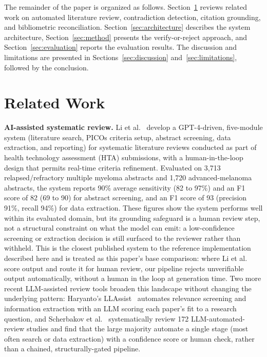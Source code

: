 \documentclass[11pt]{article}
\begin{document}
The remainder of the paper is organized as follows. Section~\ref{sec:related} reviews related work on automated literature review, contradiction detection, citation grounding, and bibliometric reconciliation. Section~\ref{sec:architecture} describes the system architecture, Section~\ref{sec:method} presents the verify-or-reject approach, and Section~\ref{sec:evaluation} reports the evaluation results. The discussion and limitations are presented in Sections~\ref{sec:discussion} and~\ref{sec:limitations}, followed by the conclusion.

\section{Related Work}
\label{sec:related}

\textbf{AI-assisted systematic review.} Li et al.~\cite{li2025enhancing} develop a GPT-4-driven, five-module system (literature search, PICOs criteria setup, abstract screening, data extraction, and reporting) for systematic literature reviews conducted as part of health technology assessment (HTA) submissions, with a human-in-the-loop design that permits real-time criteria refinement. Evaluated on 3{,}713 relapsed/refractory multiple myeloma abstracts and 1{,}720 advanced-melanoma abstracts, the system reports 90\% average sensitivity (82 to 97\%) and an F1 score of 82 (69 to 90) for abstract screening, and an F1 score of 93 (precision 91\%, recall 94\%) for data extraction. These figures show the system performs well within its evaluated domain, but its grounding safeguard is a human review step, not a structural constraint on what the model can emit: a low-confidence screening or extraction decision is still surfaced to the reviewer rather than withheld. This is the closest published system to the reference implementation described here and is treated as this paper's base comparison: where Li et al.~\cite{li2025enhancing} score output and route it for human review, our pipeline rejects unverifiable output automatically, without a human in the loop at generation time. Two more recent LLM-assisted review tools broaden this landscape without changing the underlying pattern: Haryanto's LLAssist~\cite{haryanto2024llassist} automates relevance screening and information extraction with an LLM scoring each paper's fit to a research question, and Scherbakov et al.~\cite{scherbakov2025emergence} systematically review 172 LLM-automated-review studies and find that the large majority automate a single stage (most often search or data extraction) with a confidence score or human check, rather than a chained, structurally-gated pipeline.
\end{document}
